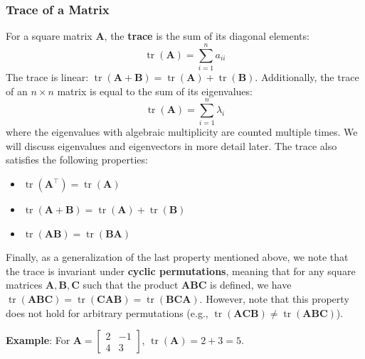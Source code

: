 \subsubsection{Trace of a Matrix}
For a square matrix $ \mathbf{A} $, the \textbf{trace} is the sum of its diagonal elements:
\begin{equation*}
    \operatorname{tr}(\mathbf{A}) = \sum_{i=1}^n a_{ii}
\end{equation*}
The trace is linear: $ \operatorname{tr}(\mathbf{A} + \mathbf{B}) = \operatorname{tr}(\mathbf{A}) + \operatorname{tr}(\mathbf{B}) $. Additionally, the trace of an $n \times n$ matrix is equal to the sum of its eigenvalues:
\begin{equation*}
    \operatorname{tr}(\mathbf{A}) = \sum_{i=1}^n \lambda_i
\end{equation*}
where the eigenvalues with algebraic multiplicity are counted multiple times. We will discuss eigenvalues and eigenvectors in more detail later. The trace also satisfies the following properties:
\begin{itemize}
    \item $ \operatorname{tr}(\mathbf{A}^\top) = \operatorname{tr}(\mathbf{A}) $
    \item $ \operatorname{tr}(\mathbf{A} + \mathbf{B}) = \operatorname{tr}(\mathbf{A}) + \operatorname{tr}(\mathbf{B}) $
    \item $ \operatorname{tr}(\mathbf{AB}) = \operatorname{tr}(\mathbf{BA}) $
\end{itemize}
Finally, as a generalization of the last property mentioned above, we note that the trace is invariant under \textbf{cyclic permutations}, meaning that for any square matrices $ \mathbf{A}, \mathbf{B}, \mathbf{C} $ such that the product $ \mathbf{ABC} $ is defined, we have $ \operatorname{tr}(\mathbf{ABC}) = \operatorname{tr}(\mathbf{CAB}) = \operatorname{tr}(\mathbf{BCA}) $. However, note that this property does not hold for arbitrary permutations (e.g., $ \operatorname{tr}(\mathbf{ACB}) \neq \operatorname{tr}(\mathbf{ABC}) $).

\begin{exampleBox}
    \textbf{Example}: For $ \mathbf{A} = \begin{bmatrix}2 & -1\\4 & 3\end{bmatrix} $, $ \operatorname{tr}(\mathbf{A}) = 2 + 3 = 5 $.
\end{exampleBox}


